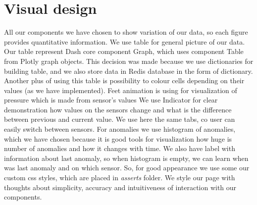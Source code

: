 \documentclass{article}
\begin{document}
\section{Visual design}
All our components we have chosen to show variation of our data, so each figure provides quantitative information.
\newline
We use table for general picture of our data. Our table represent Dash core component Graph, which uses component Table from Plotly graph objects. This decision was made because we use dictionaries for building table, and we also store data in Redis database in the form of dictionary. Another plus of using this table is possibility to colour cells depending on their values (as we have implemented).
\newline
Feet animation is using for visualization of pressure which is made from sensor's values
\newline
We use Indicator for clear demonstration how values on the sensors change and what is the difference between previous and current value. We use here the same tabs, co user can easily switch between sensors.
\newline
For anomalies we use histogram of anomalies, which we have chosen because it is good tools for visualization how huge is number of anomalies and how it changes with time. We also have label with information about last anomaly, so when histogram is empty, we can learn when was last anomaly and on which sensor.
\newline
So, for good appearance we use some our custom css styles, which are placed in \textit{asserts} folder. We style our page with thoughts about simplicity, accuracy and intuitiveness of interaction with our components.
\end{document}
